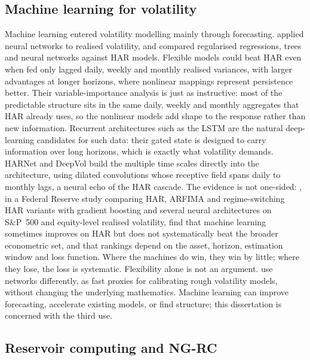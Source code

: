 \documentclass[12pt,a4paper]{article}
\begin{document}
\subsection{Machine learning for volatility}

Machine learning entered volatility modelling mainly through forecasting.
\citet{bucci2020} applied neural networks to realised volatility, and
\citet{christensen2023} compared regularised regressions, trees and
neural networks against HAR models. Flexible models could beat HAR even
when fed only lagged daily, weekly and monthly realised variances, with
larger advantages at longer horizons, where nonlinear mappings represent
persistence better. Their variable-importance analysis is just as
instructive: most of the predictable structure sits in the same daily,
weekly and monthly aggregates that HAR already uses, so the nonlinear
models add shape to the response rather than new information. Recurrent architectures such as the LSTM
\citep{lstm1997} are the natural deep-learning candidates for such data:
their gated state is designed to carry information over long horizons,
which is exactly what volatility demands. HARNet \citep{harnet2022} and
DeepVol \citep{deepvol2024} build the multiple time scales directly into
the architecture, using dilated convolutions whose receptive field spans
daily to monthly lags, a neural echo of the HAR cascade. The
evidence is not one-sided: \citet{kilic2025}, in a Federal Reserve study
comparing HAR, ARFIMA and regime-switching HAR variants with gradient
boosting and several neural architectures on S\&P~500 and equity-level
realised volatility, find that machine learning sometimes improves on HAR
but does not systematically beat the broader econometric set, and that
rankings depend on the asset, horizon, estimation window and loss
function. Where the machines do win, they win by little; where they
lose, the loss is systematic. Flexibility alone is not an argument. \citet{horvath2021} use
networks differently, as fast proxies for calibrating rough volatility
models, without changing the underlying mathematics. Machine learning can
improve forecasting, accelerate existing models, or find structure; this
dissertation is concerned with the third use.

\subsection{Reservoir computing and NG-RC}
\end{document}
